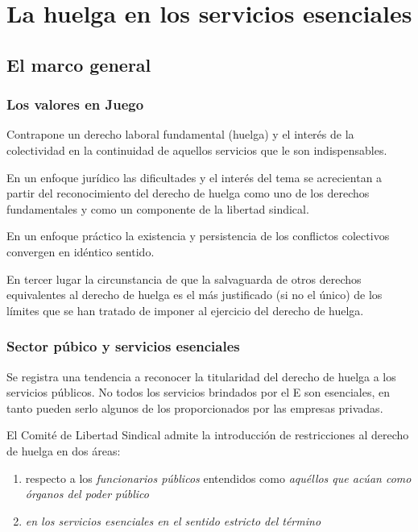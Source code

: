 \documentclass[spanish,12pt,a4paper,titlepage]{report}
\begin{document}
\chapter{La huelga en los servicios esenciales}
\section{El marco general}

\subsection{Los valores en Juego}

Contrapone un derecho laboral fundamental (huelga) y el interés de la colectividad en la continuidad de aquellos servicios que le son indispensables. 

En un enfoque jurídico las dificultades y el interés del tema se acrecientan a partir del reconocimiento del derecho de huelga como uno de los derechos fundamentales y como un componente de la libertad sindical.

En un enfoque práctico la existencia y persistencia de los conflictos colectivos convergen en idéntico sentido.

En tercer lugar la circunstancia de que la salvaguarda de otros derechos equivalentes al derecho de huelga es el más justificado (si no el único) de los límites que se han tratado de imponer al ejercicio del derecho de huelga.

\subsection{Sector púbico y servicios esenciales}

Se registra una tendencia a reconocer la titularidad del derecho de huelga a los servicios públicos.
No todos los servicios brindados por el E son esenciales, en tanto pueden serlo algunos de los proporcionados por las empresas privadas.

El Comité de Libertad Sindical admite la introducción de restricciones al derecho de huelga en dos áreas:

\begin{enumerate}
\item respecto a los \textit{funcionarios públicos} entendidos como \textit{aquéllos que acúan como órganos del poder público}
\item \textit{en los servicios esenciales en el sentido estricto del término}
\end{enumerate}
\end{document}

